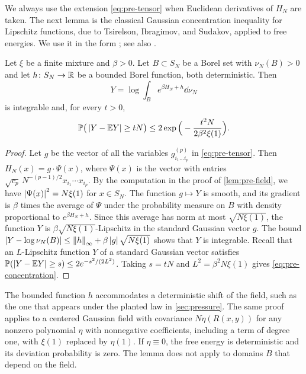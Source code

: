 We always use the extension \eqref{eq:pre-tensor} when Euclidean derivatives of $H_N$ are taken. The next lemma is the classical Gaussian concentration inequality for Lipschitz functions, due to Tsirelson, Ibragimov, and Sudakov, applied to free energies. We use it in the form \cite[Proposition~4.1 and (4.1)]{LedouxSemigroup1994}; see also \cite{Ledoux2001}.

\begin{lemma}\label{lem:pre-concentration}
Let $\xi$ be a finite mixture and $\beta>0$. Let $B\subset S_N$ be a Borel set with $\nu_N(B)>0$ and let $h\colon S_N\to\mathbb R$ be a bounded Borel function, both deterministic. Then
\[
Y=\log\int_Be^{\beta H_N+h}\dd\nu_N
\]
is integrable and, for every $t>0$,
\begin{equation}\label{eq:pre-concentration}
\mathbb P\big(\left|Y-\mathbb E Y\right|\ge tN\big)\le2\exp\Big(-\frac{t^2N}{2\beta^2\xi(1)}\Big).
\end{equation}
\end{lemma}

\begin{proof}
Let $g$ be the vector of all the variables $g^{(p)}_{i_1\dots i_p}$ in \eqref{eq:pre-tensor}. Then $H_N(x)=g\cdot\Psi(x)$, where $\Psi(x)$ is the vector with entries $\sqrt{c_p}\,N^{-(p-1)/2}x_{i_1}\cdots x_{i_p}$. By the computation in the proof of \cref{lem:pre-field}, we have $\left|\Psi(x)\right|^2=N\xi(1)$ for $x\in S_N$. The function $g\mapsto Y$ is smooth, and its gradient is $\beta$ times the average of $\Psi$ under the probability measure on $B$ with density proportional to $e^{\beta H_N+h}$. Since this average has norm at most $\sqrt{N\xi(1)}$, the function $Y$ is $\beta\sqrt{N\xi(1)}$-Lipschitz in the standard Gaussian vector $g$. The bound $\left|Y-\log\nu_N(B)\right|\le\left\lVert h\right\rVert_\infty+\beta\left|g\right|\sqrt{N\xi(1)}$ shows that $Y$ is integrable. Recall that an $L$-Lipschitz function $Y$ of a standard Gaussian vector satisfies $\mathbb P(\left|Y-\mathbb E Y\right|\ge s)\le2e^{-s^2/(2L^2)}$. Taking $s=tN$ and $L^2=\beta^2N\xi(1)$ gives \eqref{eq:pre-concentration}.
\end{proof}

The bounded function $h$ accommodates a deterministic shift of the field, such as the one that appears under the planted law in \cref{sec:pressure}. The same proof applies to a centered Gaussian field with covariance $N\eta(R(x,y))$ for any nonzero polynomial $\eta$ with nonnegative coefficients, including a term of degree one, with $\xi(1)$ replaced by $\eta(1)$. If $\eta\equiv0$, the free energy is deterministic and its deviation probability is zero. The lemma does not apply to domains $B$ that depend on the field.

